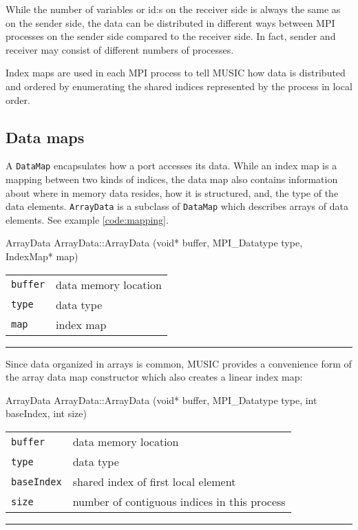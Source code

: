 \documentclass[a4paper,twoside]{report}
\makeatletter
\newenvironment{parameters}%
{\begin{tabular}{@{\hspace{2em}}lp{0.6\textwidth}}}%
{\end{tabular}\par\vspace{1mm}\par\hrule\par\vspace{5mm}}
\makeatother
\begin{document}
While the number of variables or id:s on the receiver side is always
the same as on the sender side, the data can be distributed in
different ways between MPI processes on the sender side compared to
the receiver side.  In fact, sender and receiver may consist of
different numbers of processes.

Index maps are used in each MPI process to tell MUSIC how data is
distributed and ordered by enumerating the shared indices
represented by the process in local order.

\subsection{Data maps}
\label{sec:datamap}

A \lstinline|DataMap| encapsulates how a port accesses its data.
While an index map is a mapping between two kinds of indices, the data
map also contains information about where in memory data resides, how
it is structured, and, the type of the data elements.
\lstinline|ArrayData| is a subclass of \lstinline|DataMap| which
describes arrays of data elements.  See example \ref{code:mapping}.

\begin{head}{ArrayData}
  ArrayData::ArrayData (void* buffer, MPI_Datatype type,
                        IndexMap* map)
\end{head}
\begin{parameters}
  \lstinline|buffer| & data memory location \\
  \lstinline|type|   & data type \\
  \lstinline|map|    & index map \\
\end{parameters}

Since data organized in arrays is common, MUSIC provides a convenience
form of the array data map constructor which also creates a linear
index map:

\pagebreak
\begin{head}{ArrayData}
  ArrayData::ArrayData (void* buffer,
                        MPI_Datatype type,
                        int  baseIndex,
                        int size)
\end{head}
\begin{parameters}
  \lstinline|buffer|    & data memory location \\
  \lstinline|type|	& data type \\
  \lstinline|baseIndex| & shared index of first local element \\
  \lstinline|size|      & number of contiguous indices in this process \\
\end{parameters}
\end{document}
